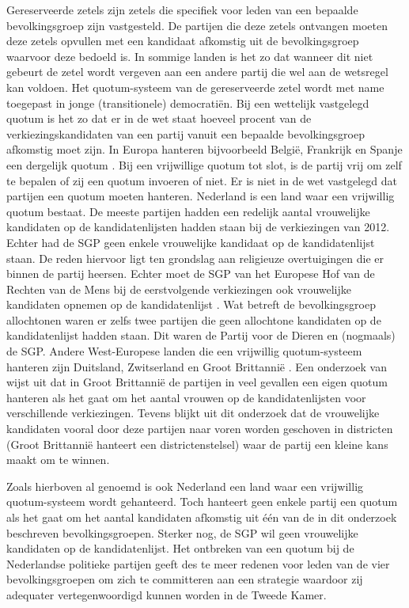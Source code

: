 Gereserveerde zetels zijn zetels die specifiek voor leden van een bepaalde bevolkingsgroep zijn vastgesteld. De partijen die deze zetels ontvangen moeten deze zetels opvullen met een kandidaat afkomstig uit de bevolkingsgroep waarvoor deze bedoeld is. In sommige landen is het zo dat wanneer dit niet gebeurt de zetel wordt vergeven aan een andere partij die wel aan de wetsregel kan voldoen. Het quotum-systeem van de gereserveerde zetel wordt met name toegepast in jonge (transitionele) democrati\"{e}n. Bij een wettelijk vastgelegd quotum is het zo dat er in de wet staat hoeveel procent van de verkiezingskandidaten van een partij vanuit een bepaalde bevolkingsgroep afkomstig moet zijn. In Europa hanteren bijvoorbeeld Belgi\"{e}, Frankrijk en Spanje een dergelijk quotum
 \citep{council2012positive}. Bij een vrijwillige quotum tot slot, is de partij vrij om zelf te bepalen of zij een quotum invoeren of niet. Er is niet in de wet vastgelegd dat partijen een quotum moeten hanteren. Nederland is een land waar een vrijwillig quotum bestaat. De meeste partijen hadden een redelijk aantal vrouwelijke kandidaten op de kandidatenlijsten hadden staan bij de verkiezingen van 2012. Echter had de SGP geen enkele vrouwelijke kandidaat op de kandidatenlijst staan. De reden hiervoor ligt ten grondslag aan religieuze overtuigingen die er binnen de partij heersen. Echter moet de SGP van het Europese Hof van de Rechten van de Mens bij de eerstvolgende verkiezingen ook vrouwelijke kandidaten opnemen op de kandidatenlijst \citep{Nudef30:online}. Wat betreft de bevolkingsgroep allochtonen waren er zelfs twee partijen die geen allochtone kandidaten op de kandidatenlijst hadden staan. Dit waren de Partij voor de Dieren en (nogmaals) de SGP. Andere West-Europese landen die een vrijwillig quotum-systeem hanteren zijn Duitsland, Zwitserland en Groot Brittannië \citep{Quota47:online}. Een onderzoek van \cite{ryan2010politics} wijst uit dat in Groot Brittannië de partijen in veel gevallen een eigen quotum hanteren als het gaat om het aantal vrouwen op de kandidatenlijsten voor verschillende verkiezingen. Tevens blijkt uit dit onderzoek dat de vrouwelijke kandidaten vooral door deze partijen naar voren worden geschoven in districten (Groot Brittannië hanteert een districtenstelsel) waar de partij een kleine kans maakt om te winnen. 

Zoals hierboven al genoemd is ook Nederland een land waar een vrijwillig quotum-systeem wordt gehanteerd.  Toch hanteert geen enkele partij een quotum als het gaat om het aantal kandidaten afkomstig uit één van de in dit onderzoek beschreven bevolkingsgroepen. Sterker nog, de SGP wil geen vrouwelijke kandidaten op de kandidatenlijst. Het ontbreken van een quotum bij de Nederlandse politieke partijen geeft des te meer redenen voor leden van de vier bevolkingsgroepen om zich te committeren aan een strategie waardoor zij adequater vertegenwoordigd kunnen worden in de Tweede Kamer.

